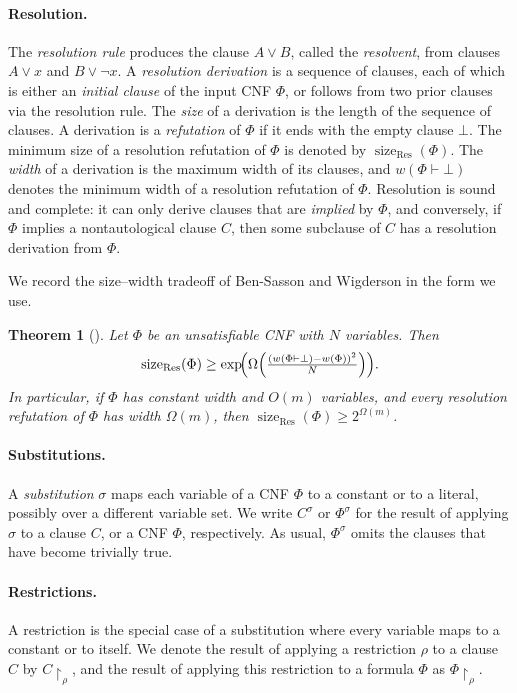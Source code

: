 \documentclass[11pt]{article}
\newtheorem{theorem}{Theorem}[section]
\theoremstyle{definition}
\theoremstyle{remark}
\newcommand{\sizeRes}{\operatorname{size}_{\mathrm{Res}}}
\begin{document}
\paragraph{Resolution.}
The \emph{resolution rule} produces the clause $A\vee B$, called the \emph{resolvent}, from clauses $A\vee x$ and $B\vee\neg x$. A
\emph{resolution derivation} is a sequence of clauses, each of which is either an \emph{initial clause} of the input CNF $\Phi$, or follows from two prior clauses via the resolution rule. The \emph{size} of a derivation is the length of the sequence of clauses.
A derivation is a \emph{refutation} of $\Phi$ if it ends with the empty clause $\bot$. The minimum size of a resolution refutation of $\Phi$ is denoted by
$\sizeRes(\Phi)$. The \emph{width} of a derivation is the maximum width of its clauses, and $w(\Phi\vdash\bot)$ denotes the minimum width of a resolution refutation of $\Phi$. 
Resolution is sound and complete: it can only derive clauses that are \emph{implied} by $\Phi$, and conversely, if $\Phi$ implies a nontautological
clause $C$, then some subclause of $C$ has a resolution derivation from $\Phi$.

We record the size--width tradeoff of Ben-Sasson and Wigderson in the form we use.

\begin{theorem}[\cite{bw}]
\label{thm:bw}
Let $\Phi$ be an unsatisfiable CNF with $N$ variables. Then
\[
\sizeRes(\Phi)\ge \exp\!\Bigl(\Omega\Bigl(\tfrac{(w(\Phi\vdash\bot)-w(\Phi))^2}{N}\Bigr)\Bigr).
\]
In particular, if $\Phi$ has constant width and $O(m)$ variables, and every resolution refutation of $\Phi$ has width $\Omega(m)$, then
$\sizeRes(\Phi)\ge 2^{\Omega(m)}$.
\end{theorem}

\paragraph{Substitutions.}
A \emph{substitution} $\sigma$ maps each variable of a CNF $\Phi$ to a constant
or to a literal, possibly over a different variable set. We write $C^\sigma$ or $\Phi^\sigma$ for the result of applying $\sigma$ to a clause $C$, or a CNF $\Phi$, respectively. As usual, $\Phi^\sigma$ omits the clauses that have become trivially true.

\paragraph{Restrictions.}
A restriction is the special case of a substitution where every variable maps to a
constant or to itself. We denote the result of applying a restriction $\rho$ to a clause $C$ by $C\!\upharpoonright_\rho$, and the result of applying this restriction to a formula $\Phi$ as $\Phi\!\upharpoonright_\rho$.
\end{document}
